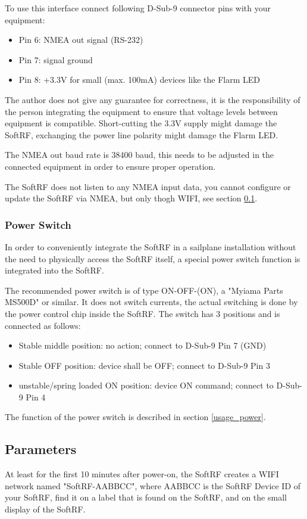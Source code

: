 \documentclass[11pt,a4paper]{article}
\begin{document}
To use this interface connect following D-Sub-9 connector pins with your equipment:
\begin{itemize}
\item Pin 6: NMEA out signal (RS-232)
\item Pin 7: signal ground
\item Pin 8: +3.3V for small (max. 100mA) devices like the Flarm LED
\end{itemize}

The author does not give any guarantee for correctness, it is the responsibility of the person integrating the equipment to ensure that voltage levels between equipment is compatible. Short-cutting the 3.3V supply might damage the SoftRF, exchanging the power line polarity might damage the Flarm LED.

The NMEA out baud rate is 38400 baud, this needs to be adjusted in the connected equipment in order to ensure proper operation.

The SoftRF does not listen to any NMEA input data, you cannot configure or update the SoftRF via NMEA, but only thogh WIFI, see section \ref{parameters}.

\subsubsection{Power Switch}
In order to conveniently integrate the SoftRF in a sailplane installation without the need to physically access the SoftRF itself, a special power switch function is integrated into the SoftRF. 

The recommended power switch is of type ON-OFF-(ON), a "Myiama Parts MS500D" or similar. It does not switch currents, the actual switching is done by the power control chip inside the SoftRF. The switch has 3 positions and is connected as follows:

\begin{itemize}
\item Stable middle position: no action; connect to D-Sub-9 Pin 7 (GND)
\item Stable OFF position: device shall be OFF; connect to D-Sub-9 Pin 3
\item unstable/spring loaded ON position: device ON command; connect to D-Sub-9 Pin 4
\end{itemize}

The function of the power switch is described in section \ref{usage_power}.

\subsection{Parameters}\label{parameters}
At least for the first 10 minutes after power-on, the SoftRF creates a WIFI network named "SoftRF-AABBCC", where AABBCC is the SoftRF Device ID of your SoftRF, find it on a label that is found on the SoftRF, and on the small display of the SoftRF.
\end{document}
